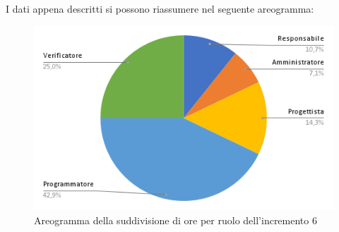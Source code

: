 \pagebreak
I dati appena descritti si possono riassumere nel seguente areogramma:
\begin{figure}[!h]
    \vspace{5px}
    \includegraphics[scale=0.5]{../../../Images/Diagrammi/Diagramma a torta/areogrammaIncremento11.png}
    \centering
    \caption{Areogramma della suddivisione di ore per ruolo dell'incremento 6}
\end{figure}

